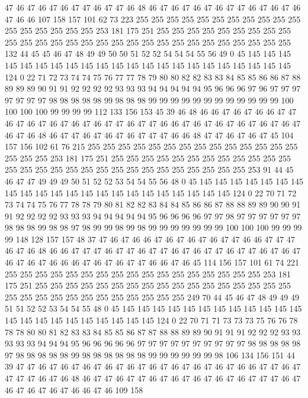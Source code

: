 47 46 47 46 47 46 47 47 46 47 47 46 48 46 47 46 47 46 47 46
47 47 46 47 46 47 46 47 46 46 107 158 157 101 62 73 223 255 255 255
255 255 255 255 255 255 255 255 255 255 255 255 255 255 253 181 175 251 255 255
255 255 255 255 255 255 255 255 255 255 255 255 255 255 255 255 255 255 255 255
255 255 255 255 255 255 132 44 45 45 46 47 48 49 49 50 50 51 52 52
54 54 54 55 56 49 0 45 145 145 145 145 145 145 145 145 145 145 145 145
145 145 145 145 145 145 145 145 145 145 124 0 22 71 72 73 74 74 75 76
77 77 78 79 80 80 82 82 83 83 84 85 85 86 86 87 88 89 89 89
90 91 91 92 92 92 92 93 93 93 94 94 94 94 94 95 96 96 96 97
96 97 97 97 97 97 97 97 98 98 98 98 98 99 98 98 98 99 99 99
99 99 99 99 99 99 99 99 99 100 100 100 100 99 99 99 99 112 133 156
153 45 39 46 48 46 46 47 46 47 46 46 47 47 46 47 46 47 46 47
46 47 46 47 47 46 47 47 46 46 47 46 47 46 47 46 47 46 47 46
47 46 47 46 48 46 47 47 46 47 46 47 46 47 47 47 46 46 48 47
47 46 47 46 47 45 104 157 156 102 61 76 215 255 255 255 255 255 255 255
255 255 255 255 255 255 255 255 255 255 253 181 175 251 255 255 255 255 255 255
255 255 255 255 255 255 255 255 255 255 255 255 255 255 255 255 255 255 255 255
255 255 253 91 44 45 46 47 47 49 49 49 50 51 52 52 53 54 54 55
56 48 0 45 145 145 145 145 145 145 145 145 145 145 145 145 145 145 145 145
145 145 145 145 145 145 124 0 22 70 71 72 73 74 74 75 76 77 78 78
79 80 81 82 82 83 84 84 85 86 86 87 88 88 89 89 90 90 91 91
92 92 92 92 93 93 93 94 94 94 94 94 95 96 96 96 96 97 97 98
97 97 97 97 97 97 98 98 98 99 98 98 97 98 99 99 98 99 98 99
99 99 99 99 99 99 100 100 100 99 99 99 99 148 128 157 157 48 37 47
46 47 46 46 47 46 47 46 47 46 47 47 46 46 47 47 47 46 47 46
48 46 46 47 47 47 46 47 47 46 47 47 46 47 46 47 47 46 47 47
46 47 46 47 46 47 46 47 46 46 46 47 46 47 46 47 47 46 46 47
46 45 114 156 157 101 61 74 221 255 255 255 255 255 255 255 255 255 255 255
255 255 255 255 255 255 253 181 175 251 255 255 255 255 255 255 255 255 255 255
255 255 255 255 255 255 255 255 255 255 255 255 255 255 255 255 255 255 255 249
70 44 45 46 47 48 49 49 49 51 51 52 52 53 54 54 55 48 0 45
145 145 145 145 145 145 145 145 145 145 145 145 145 145 145 145 145 145 145 145
145 145 124 0 22 70 71 71 73 73 73 75 76 76 78 78 78 80 80 81
82 83 83 84 85 85 86 87 87 88 88 89 89 90 91 91 91 92 92 92
93 93 93 93 93 94 94 94 95 96 96 96 96 96 97 97 97 97 97 97
97 97 97 97 98 98 98 98 98 97 98 98 98 98 98 99 98 98 98 98
98 98 99 99 99 99 99 99 98 106 134 156 151 44 39 47 47 46 47 46
47 46 47 46 47 46 47 46 47 46 47 46 47 46 47 46 46 47 47 46
47 47 47 47 46 47 46 48 46 47 47 46 47 47 46 47 46 47 46 47
46 47 46 47 47 47 46 47 46 47 46 47 46 47 46 46 47 46 109 158
